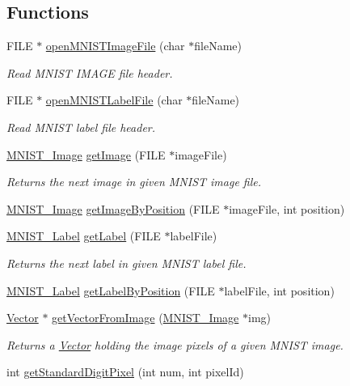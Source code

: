 \subsection*{Functions}
\begin{DoxyCompactItemize}
\item 
F\+I\+L\+E $\ast$ \hyperlink{mnist-utils_8h_a8a5ef24b830e1a8f15a080db2ab8bb12}{open\+M\+N\+I\+S\+T\+Image\+File} (char $\ast$file\+Name)
\begin{DoxyCompactList}\small\item\em Read M\+N\+I\+S\+T I\+M\+A\+G\+E file header. \end{DoxyCompactList}\item 
F\+I\+L\+E $\ast$ \hyperlink{mnist-utils_8h_a443abebe82519f810aeb2cb226d4bc99}{open\+M\+N\+I\+S\+T\+Label\+File} (char $\ast$file\+Name)
\begin{DoxyCompactList}\small\item\em Read M\+N\+I\+S\+T label file header. \end{DoxyCompactList}\item 
\hyperlink{struct_m_n_i_s_t___image}{M\+N\+I\+S\+T\+\_\+\+Image} \hyperlink{mnist-utils_8h_a0076b10c59220ac7cbf26d0c79b330d0}{get\+Image} (F\+I\+L\+E $\ast$image\+File)
\begin{DoxyCompactList}\small\item\em Returns the next image in given M\+N\+I\+S\+T image file. \end{DoxyCompactList}\item 
\hyperlink{struct_m_n_i_s_t___image}{M\+N\+I\+S\+T\+\_\+\+Image} \hyperlink{mnist-utils_8h_aee2b09d74a09167a2a9e2e502ee417b8}{get\+Image\+By\+Position} (F\+I\+L\+E $\ast$image\+File, int position)
\item 
\hyperlink{mnist-utils_8h_ac563f2337f8e23f2dcc095e41c138bfa}{M\+N\+I\+S\+T\+\_\+\+Label} \hyperlink{mnist-utils_8h_ae38097965d1c8edf5b054aee0adafe0d}{get\+Label} (F\+I\+L\+E $\ast$label\+File)
\begin{DoxyCompactList}\small\item\em Returns the next label in given M\+N\+I\+S\+T label file. \end{DoxyCompactList}\item 
\hyperlink{mnist-utils_8h_ac563f2337f8e23f2dcc095e41c138bfa}{M\+N\+I\+S\+T\+\_\+\+Label} \hyperlink{mnist-utils_8h_a07653e83b31f5347c3a38d502ce0fcf6}{get\+Label\+By\+Position} (F\+I\+L\+E $\ast$label\+File, int position)
\item 
\hyperlink{struct_vector}{Vector} $\ast$ \hyperlink{mnist-utils_8h_a30f07d837cc0a1091e998ca7cddeb2f4}{get\+Vector\+From\+Image} (\hyperlink{struct_m_n_i_s_t___image}{M\+N\+I\+S\+T\+\_\+\+Image} $\ast$img)
\begin{DoxyCompactList}\small\item\em Returns a \hyperlink{struct_vector}{Vector} holding the image pixels of a given M\+N\+I\+S\+T image. \end{DoxyCompactList}\item 
int \hyperlink{mnist-utils_8h_a809b5e203ded6cda3999459a9a7c39b6}{get\+Standard\+Digit\+Pixel} (int num, int pixel\+Id)
\end{DoxyCompactItemize}


